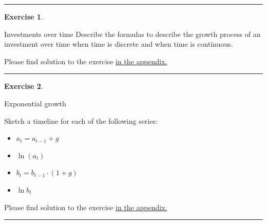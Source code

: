 \documentclass[
  12pt,
  oneside]{book}
\providecommand{\tightlist}{%
  \setlength{\itemsep}{0pt}\setlength{\parskip}{0pt}}
\theoremstyle{definition}
\theoremstyle{definition}
\theoremstyle{definition}
\newtheorem{exercise}{Exercise}[chapter]
\theoremstyle{definition}
\theoremstyle{remark}
\begin{document}
\begin{center}\rule{0.5\linewidth}{0.5pt}\end{center}

\begin{exercise}
\protect\hypertarget{exr:invovertime}{}\label{exr:invovertime}

Investments over time
Describe the formulas to describe the growth process of an investment over time when time is discrete and when time is continuous.

Please find solution to the exercise \protect\hyperlink{sol:invovertime}{in the appendix.}

\begin{center}\rule{0.5\linewidth}{0.5pt}\end{center}

\end{exercise}

\begin{exercise}
\protect\hypertarget{exr:expovertime}{}\label{exr:expovertime}

Exponential growth

Sketch a timeline for each of the following series:

\begin{itemize}
\tightlist
\item
  \(a_t=a_{t-1}+g\)
\item
  \(\ln(a_t)\)
\item
  \(b_t=b_{t-1}\cdot (1+g)\)
\item
  \(\ln b_t\)
\end{itemize}

Please find solution to the exercise \protect\hyperlink{sol:expovertime}{in the appendix.}

\begin{center}\rule{0.5\linewidth}{0.5pt}\end{center}

\end{exercise}
\end{document}
